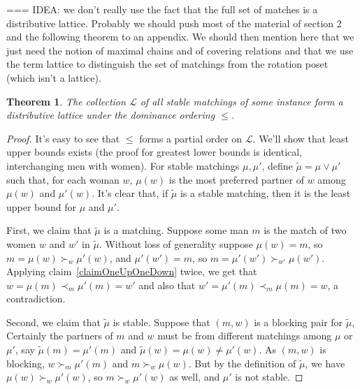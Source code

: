 \documentclass[12pt]{article}
\renewcommand{\L}{\mathcal{L}}
\newtheorem{theorem}[definition]{Theorem}
\begin{document}
  === IDEA: we don't really use the fact that the full set of matches is a
  distributive lattice. Probably we should push most of the material of section
  2 and the following theorem to an appendix. We should then mention here that
  we just need the notion of maximal chains and of covering relations and that
  we use the term lattice to distinguish the set of matchings from the rotation
  poset (which isn't a lattice).
  \begin{theorem}
    The collection $\L$ of all stable matchings of some instance
    form a distributive lattice under the dominance ordering $\le$.
  \end{theorem}
  \begin{proof}
    It's easy to see that $\le$ forms a partial order on $\L$.
    We'll show that least upper bounds exists (the proof for greatest lower
    bounds is identical, interchanging men with women).
    For stable matchings $\mu,\mu'$, define
    $\tilde\mu = \mu\vee\mu'$ such that, for each woman $w$,
    $\mu(w)$ is the most preferred partner
    of $w$ among $\mu(w)$ and $\mu'(w)$.
    It's clear that, if $\tilde\mu$ is a stable matching,
    then it is the least upper bound for $\mu$ and $\mu'$.

    First, we claim that $\tilde\mu$ is a matching.
    Suppose some man $m$ is the match of two women $w$ and $w'$ in
    $\tilde\mu$. Without loss of generality suppose $\mu(w)=m$,
    so $m=\mu(w)\succ_w \mu'(w)$,
    and $\mu'(w')=m$, so $m=\mu'(w')\succ_{w'}\mu(w')$.
    Applying claim~\ref{claimOneUpOneDown} twice,
    we get that $w=\mu(m)\prec_m \mu'(m)=w'$
    and also that $w'=\mu'(m)\prec_m \mu(m)=w$,
    a contradiction.

    Second, we claim that $\tilde\mu$ is stable.
    Suppose that $(m,w)$ is a blocking pair for $\tilde\mu$,
    Certainly the partners of $m$ and $w$ must be from different matchings among
    $\mu$ or $\mu'$, say $\tilde\mu(m)=\mu'(m)$ and 
    $\tilde\mu(w)=\mu(w)\ne \mu'(w)$.
    As $(m,w)$ is blocking, $w\succ_m\mu'(m)$ and $m\succ_w\mu(w)$.
    But by the definition of $\tilde\mu$, we have $\mu(w)\succ_w\mu'(w)$,
    so $m\succ_w\mu'(w)$ as well, and $\mu'$ is not stable.


\end{proof}
\end{document}
